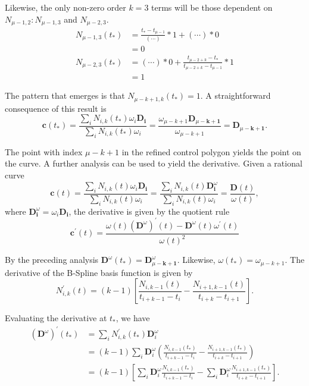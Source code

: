 \documentclass[acmtog]{acmart}
\begin{document}
Likewise, the only non-zero order $k=3$ terms will be those dependent on $N_{\mu-1,2}: N_{\mu-1,3}$ and $N_{\mu-2,3}$.
$$
\begin{aligned}
N_{\mu-1,3}\left(t_*\right) & =\frac{t_*-t_{\mu-1}}{(\cdots)} * 1+(\cdots) * 0 \\
& =0 \\
N_{\mu-2,3}\left(t_*\right) & =(\cdots) * 0+\frac{t_{\mu-2+k}-t_*}{t_{\mu-2+k}-t_{\mu-1}} * 1 \\
& =1
\end{aligned}
$$

The pattern that emerges is that $N_{\mu-k+1, k}\left(t_*\right)=1$. A straightforward consequence of this result is
$$
\mathbf{c}\left(t_*\right)=\frac{\sum_i N_{i, k}\left(t_*\right) \omega_i \mathbf{D}_{\mathbf{i}}}{\sum_i N_{i, k}\left(t_*\right) \omega_i}=\frac{\omega_{\mu-k+1} \mathbf{D}_{\mu-\mathbf{k}+\mathbf{1}}}{\omega_{\mu-k+1}}=\mathbf{D}_{\mu-\mathbf{k}+\mathbf{1}} .
$$

The point with index $\mu-k+1$ in the refined control polygon yields the point on the curve.
A further analysis can be used to yield the derivative. Given a rational curve
$$
\mathbf{c}(t)=\frac{\sum_i N_{i, k}(t) \omega_i \mathbf{D}_{\mathbf{i}}}{\sum_i N_{i, k}(t) \omega_i}=\frac{\sum_i N_{i, k}(t) \mathbf{D}_{\mathbf{i}}^\omega}{\sum_i N_{i, k}(t) \omega_i}=\frac{\mathbf{D}(t)}{\omega(t)},
$$
where $\mathbf{D}_{\mathbf{i}}^\omega=\omega_i \mathbf{D}_{\mathbf{i}}$, the derivative is given by the quotient rule
$$
\mathbf{c}^{\prime}(t)=\frac{\omega(t)\left(\mathbf{D}^\omega\right)^{\prime}(t)-\mathbf{D}^\omega(t) \omega^{\prime}(t)}{\omega(t)^2}
$$

By the preceding analysis $\mathbf{D}^\omega\left(t_*\right)=\mathbf{D}_{\mu-\mathbf{k}+\mathbf{1}}^\omega$. Likewise, $\omega\left(t_*\right)=\omega_{\mu-k+1}$. The derivative of the B-Spline basis function is given by
$$
N_{i, k}^{\prime}(t)=(k-1)\left[\frac{N_{i, k-1}(t)}{t_{i+k-1}-t_i}-\frac{N_{i+1, k-1}(t)}{t_{i+k}-t_{i+1}}\right] .
$$

Evaluating the derivative at $t_*$, we have
$$
\begin{aligned}
\left(\mathbf{D}^\omega\right)^{\prime}\left(t_*\right) & =\sum_i N_{i, k}^{\prime}\left(t_*\right) \mathbf{D}_i^\omega \\
& =(k-1) \sum_i \mathbf{D}_i^\omega\left(\frac{N_{i, k-1}\left(t_*\right)}{t_{i+k-1}-t_i}-\frac{N_{i+1, k-1}\left(t_*\right)}{t_{i+k}-t_{i+1}}\right) \\
& =(k-1)\left[\sum_i \mathbf{D}_i^\omega \frac{N_{i, k-1}\left(t_*\right)}{t_{i+k-1}-t_i}-\sum_i \mathbf{D}_i^\omega \frac{N_{i+1, k-1}\left(t_*\right)}{t_{i+k}-t_{i+1}}\right] .
\end{aligned}
$$
\end{document}
